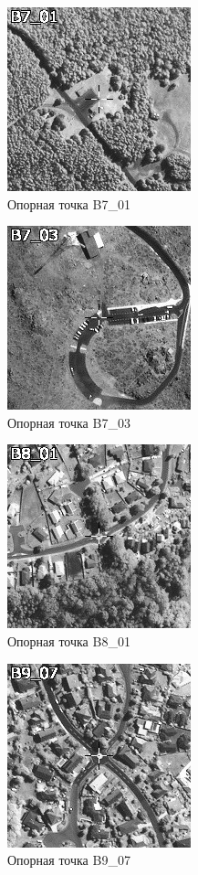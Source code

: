 \documentclass[
  12pt,
]{book}
\begin{document}
\begin{figure}
\centering
\includegraphics{images/Ref17/B7_01.jpeg}
\caption{Опорная точка B7\_01}
\end{figure}

\begin{figure}
\centering
\includegraphics{images/Ref17/B7_03.jpeg}
\caption{Опорная точка B7\_03}
\end{figure}

\begin{figure}
\centering
\includegraphics{images/Ref17/B8_01.jpeg}
\caption{Опорная точка B8\_01}
\end{figure}

\begin{figure}
\centering
\includegraphics{images/Ref17/B9_07.jpeg}
\caption{Опорная точка B9\_07}
\end{figure}
\end{document}

